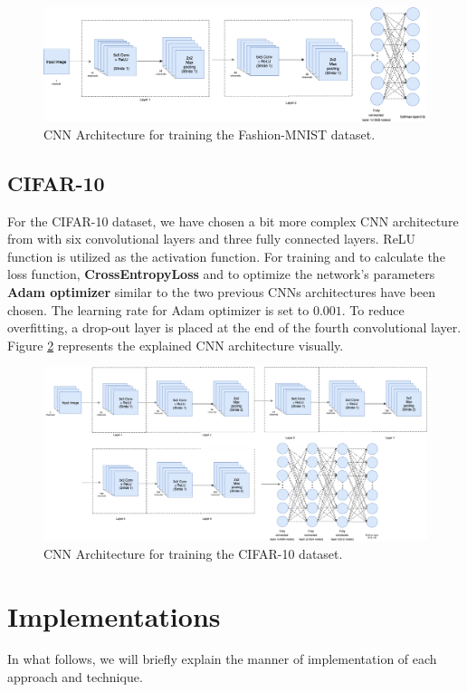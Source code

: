 \begin{figure}
  \centering
  \label{fig:Fashion_MNIST_CNN_Architecture}
  \includegraphics[width=1\textwidth]{fig/Fashion-MNIST-CNN-Architecture}
  \caption{CNN Architecture for training the Fashion-MNIST dataset.}
\end{figure}

\subsection{CIFAR-10}
For the CIFAR-10 dataset, we have chosen a bit more complex CNN architecture from
\cite{CIFAR_CNN_Architecture} with six
convolutional layers and three fully connected layers. ReLU function is utilized as the activation
function. For training and to calculate the loss function, \textbf{CrossEntropyLoss} and
to optimize the network's parameters \textbf{Adam optimizer} similar to the two previous CNNs architectures have been
chosen. The learning rate for Adam optimizer is set to $0.001$. To reduce overfitting, a
drop-out layer is placed at the end of the fourth convolutional layer. Figure \ref{fig:CIFAR_CNN_Architecture} represents the explained CNN architecture visually.


\begin{figure}
  \centering
  \label{fig:CIFAR_CNN_Architecture}
  \includegraphics[width=1\textwidth]{fig/CIFAR-CNN-Architecture}
  \caption{CNN Architecture for training the CIFAR-10 dataset.}
\end{figure}

\section{Implementations}
In what follows, we will briefly explain the manner of implementation of each
approach and technique.


